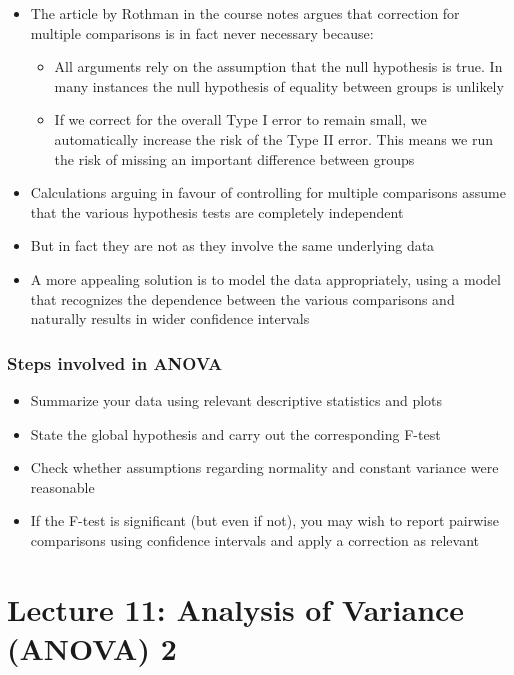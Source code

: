 \documentclass[
]{book}
\providecommand{\tightlist}{%
  \setlength{\itemsep}{0pt}\setlength{\parskip}{0pt}}
\begin{document}
\begin{itemize}
\tightlist
\item
  The article by Rothman in the course notes argues that correction for multiple comparisons is in fact never necessary because:

  \begin{itemize}
  \tightlist
  \item
    All arguments rely on the assumption that the null hypothesis is true. In many instances the null hypothesis of equality between groups is unlikely
  \item
    If we correct for the overall Type I error to remain small, we automatically increase the risk of the Type II error. This means we run the risk of missing an important difference between groups
  \end{itemize}
\item
  Calculations arguing in favour of controlling for multiple comparisons assume that the various hypothesis tests are completely independent
\item
  But in fact they are not as they involve the same underlying data
\item
  A more appealing solution is to model the data appropriately, using a model that recognizes the dependence between the various comparisons and naturally results in wider confidence intervals
\end{itemize}

\hypertarget{steps-involved-in-anova}{%
\subsection{Steps involved in ANOVA}\label{steps-involved-in-anova}}

\begin{itemize}
\tightlist
\item
  Summarize your data using relevant descriptive statistics and plots
\item
  State the global hypothesis and carry out the corresponding F-test
\item
  Check whether assumptions regarding normality and constant variance were reasonable
\item
  If the F-test is significant (but even if not), you may wish to report pairwise comparisons using confidence intervals and apply a correction as relevant
\end{itemize}

\hypertarget{lecture-11-analysis-of-variance-anova-2}{%
\chapter{Lecture 11: Analysis of Variance (ANOVA) 2}\label{lecture-11-analysis-of-variance-anova-2}}
\end{document}
